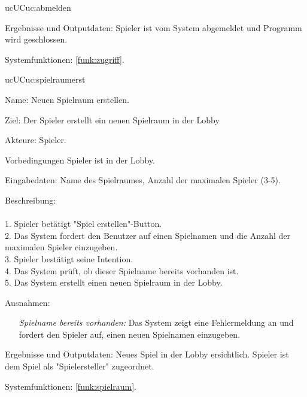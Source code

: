 \begin{description}[leftmargin=5em, style=sameline]
\begin{lhp}{uc}{UC}{uc:abmelden}
\begin{itemize}
			\end{itemize}
		\item [Ergebnisse und Outputdaten:] Spieler ist vom System abgemeldet und Programm wird geschlossen. 	
		\item [Systemfunktionen:] \ref{funk:zugriff}.
	\end{lhp}

	\begin{lhp}{uc}{UC}{uc:spielraumerst}
		\item [Name:] Neuen Spielraum erstellen.
		\item [Ziel:] Der Spieler erstellt ein neuen Spielraum in der Lobby
		\item [Akteure:] Spieler.
		\item [Vorbedingungen] Spieler ist in der Lobby.
		\item [Eingabedaten:] Name des Spielraumes, Anzahl der maximalen Spieler (3-5).
		\item [Beschreibung:] \hfill\\ \hfill\\
			1. Spieler betätigt "{}Spiel erstellen{}"{}-Button.\\
			2. Das System fordert den Benutzer auf einen Spielnamen und die Anzahl der maximalen Spieler einzugeben.\\
			3. Spieler bestätigt seine Intention.\\
			4. Das System prüft, ob dieser Spielname bereits vorhanden ist.	\\		
			5. Das System erstellt einen neuen Spielraum in der Lobby. \\
		\item [Ausnahmen:] \hfill
			\begin{itemize} 
				\item[] \textit{Spielname bereits vorhanden:} Das System zeigt eine Fehlermeldung an und fordert den Spieler auf, einen neuen Spielnamen einzugeben.
				
			\end{itemize}
		\item [Ergebnisse und Outputdaten:] Neues Spiel in der Lobby ersichtlich. Spieler ist dem Spiel als "{}Spielersteller{}"{} zugeordnet.  	
		\item [Systemfunktionen:] \ref{funk:spielraum}.
	\end{lhp}


\end{description}
